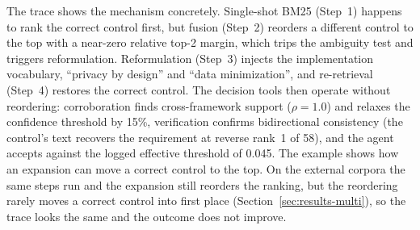 \documentclass[smallextended,natbib]{svjour3}
\begin{document}
\begin{table}[htbp]
\caption{Example agent trace, generated directly from the exported log: GDPR Art.~25 (data protection by design and by default), correctly mapped to a privacy-by-design control. Confidence values in Steps~2--4 are fused RRF scores; the reformulation trigger and the effective threshold are logged as shown.}
\label{tab:trace}
\centering
\setlength{\tabcolsep}{3pt}
\small
{}
\end{table}

The trace shows the mechanism concretely.
Single-shot BM25 (Step~1) happens to rank the correct control first, but fusion (Step~2) reorders a different control to the top with a near-zero relative top-2 margin, which trips the ambiguity test and triggers reformulation.
Reformulation (Step~3) injects the implementation vocabulary, ``privacy by design'' and ``data minimization'', and re-retrieval (Step~4) restores the correct control.
The decision tools then operate without reordering: corroboration finds cross-framework support ($\rho=1.0$) and relaxes the confidence threshold by 15\%, verification confirms bidirectional consistency (the control's text recovers the requirement at reverse rank~1 of 58), and the agent accepts against the logged effective threshold of 0.045.
The example shows how an expansion can move a correct control to the top. On the external corpora the same steps run and the expansion still reorders the ranking, but the reordering rarely moves a correct control into first place (Section~\ref{sec:results-multi}), so the trace looks the same and the outcome does not improve.
\end{document}
